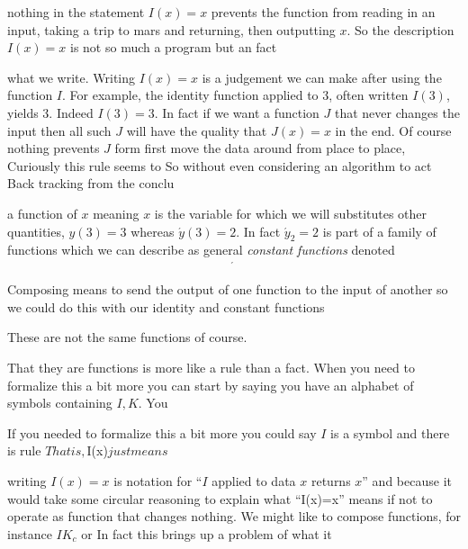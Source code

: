 nothing in the statement $I(x)=x$ prevents the function 
from reading in an input, taking a trip to mars and returning, then 
outputting $x$.  So the description $I(x)=x$ is not so much a program 
but an fact

what we write.
Writing $I(x)=x$ is a judgement we can make after using the function $I$.
For example, the identity function applied to $3$, often written $I(3)$, yields 
3.  Indeed $I(3)=3$.  In fact if we want a function $J$ that never changes the input 
then all such $J$ will have the quality that $J(x)=x$ in the end.  Of course 
nothing prevents $J$ form first move the data around from place to place, 
Curiously 
this rule seems to So without 
even considering an algorithm to act Back tracking from the conclu

a function of $x$ meaning $x$ is the variable for which we 
will substitutes other quantities, $y(3)=3$ whereas $\acute{y}(3)=2$.
In fact $\acute{y}_2=2$ is part of a family of functions which we can describe 
as general \emph{constant functions} denoted 
\begin{align*}
    \acute{}
\end{align*} 

Composing means to send the output of one function to the input 
of another so we could do this with our identity and constant functions 



These are not the same functions of course.  

That they are functions is more like a rule than a fact.  When you 
need to formalize this a bit more you can start by saying you have an alphabet 
of symbols containing $I,K$.  You 


If you needed 
to formalize this a bit more you could say $I$ is a symbol and there is rule 
$That is,
$I(x)$ just means $

writing $I(x)=x$ is notation for ``$I$ applied to data $x$ returns $x$'' and 
because 
it would take some circular reasoning to explain what ``I(x)=x'' means if not 
to operate as function that changes nothing.  We might like to compose functions, 
for instance $IK_c$ or 
In fact this brings up a problem 
of what it 


\section{}